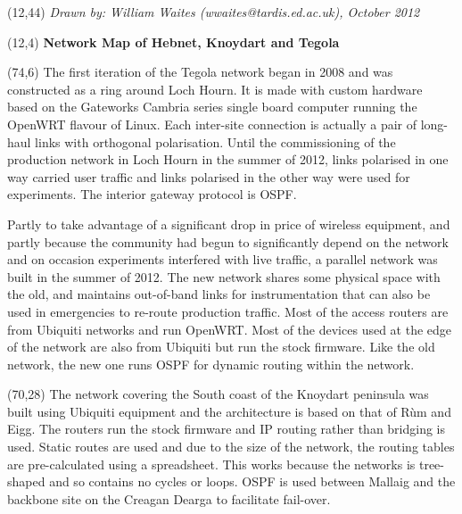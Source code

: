 \documentclass[noborder,onecolumn]{netmap}
\begin{document}
\begin{textblock}{32}(12,44)
  \textit{Drawn by: William Waites (wwaites@tardis.ed.ac.uk), October 2012}
\end{textblock}
\begin{textblock}{32}(12,4)
  \textbf{\Huge Network Map of Hebnet, Knoydart and Tegola}
\end{textblock}
\begin{textblock}{10}(74,6)
  \linespread{1.0}
  \tiny
  The first iteration of the Tegola network began in 2008 and was
    constructed as a ring around Loch Hourn. It is made with custom
    hardware based on the Gateworks Cambria series single board computer
    running the OpenWRT flavour of Linux. Each inter-site connection is
    actually a pair of long-haul links with orthogonal polarisation. Until
    the commissioning of the production network in Loch Hourn in the
    summer of 2012, links polarised in one way carried user traffic and
    links polarised in the other way were used for experiments. The
    interior gateway protocol is OSPF.

    Partly to take advantage of a significant drop in price of
    wireless equipment, and partly because the community had begun to
    significantly depend on the network and on occasion experiments
    interfered with live traffic, a parallel network was built in the
    summer of 2012. The new network shares some physical space with the
    old, and maintains out-of-band links for instrumentation that can also
    be used in emergencies to re-route production traffic. Most of the
    access routers are from Ubiquiti networks and run OpenWRT. Most of the
    devices used at the edge of the network are also from Ubiquiti but run
    the stock firmware.  Like the old network, the new one runs OSPF for
    dynamic routing within the network.
\end{textblock}
\begin{textblock}{10}(70,28)
  \linespread{1.0}
  \tiny
  The network covering the South coast of the Knoydart peninsula was
  built using Ubiquiti equipment and the architecture is based on that
  of Rùm and Eigg. The routers run the stock firmware and IP routing
  rather than bridging is used. Static routes are used and due to the
  size of the network, the routing tables are pre-calculated using a
  spreadsheet. This works because the networks is tree-shaped and so
  contains no cycles or loops. OSPF is used between Mallaig and the
  backbone site on the Creagan Dearga to facilitate fail-over.
\end{textblock}
\end{document}
